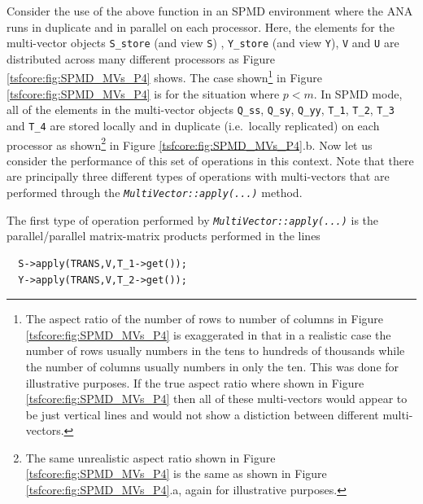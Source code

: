 Consider the use of the above function in an SPMD environment where
the ANA runs in duplicate and in parallel on each processor.  Here,
the elements for the multi-vector objects {}\texttt{S\_store} (and
view {}\texttt{S}) , {}\texttt{Y\_store} (and view {}\texttt{Y}),
{}\texttt{V} and {}\texttt{U} are distributed across many different
processors as Figure {}\ref{tsfcore:fig:SPMD_MVs_P4} shows.  The
case shown\footnote{The aspect ratio of the number of rows to number
of columns in Figure {}\ref{tsfcore:fig:SPMD_MVs_P4} is
exaggerated in that in a realistic case the number of rows usually
numbers in the tens to hundreds of thousands while the number of
columns usually numbers in only the ten.  This was done for
illustrative purposes.  If the true aspect ratio where shown in Figure
{}\ref{tsfcore:fig:SPMD_MVs_P4} then all of these multi-vectors
would appear to be just vertical lines and would not show a distiction
between different multi-vectors.} in Figure
{}\ref{tsfcore:fig:SPMD_MVs_P4} is for the situation where $p <
m$.  In SPMD mode, all of the elements in the multi-vector objects
{}\texttt{Q\_ss}, {}\texttt{Q\_sy}, {}\texttt{Q\_yy}, {}\texttt{T\_1},
{}\texttt{T\_2}, {}\texttt{T\_3} and {}\texttt{T\_4} are stored
locally and in duplicate (i.e.~locally replicated) on each processor
as shown\footnote{The same unrealistic aspect ratio shown in Figure
{}\ref{tsfcore:fig:SPMD_MVs_P4} is the same as
shown in Figure {}\ref{tsfcore:fig:SPMD_MVs_P4}.a, again for
illustrative purposes.} in Figure
{}\ref{tsfcore:fig:SPMD_MVs_P4}.b.  Now let us
consider the performance of this set of operations in this context.
Note that there are principally three different types of operations
with multi-vectors that are performed through the
{}\texttt{\textit{Multi\-Vector\-::apply(\-...)}} method.

The first type of operation performed by
{}\texttt{\textit{Multi\-Vector\-::apply(\-...)}} is the
parallel/parallel matrix-matrix products performed in the lines

{\scriptsize\begin{verbatim}
  S->apply(TRANS,V,T_1->get());
  Y->apply(TRANS,V,T_2->get());
\end{verbatim}}

